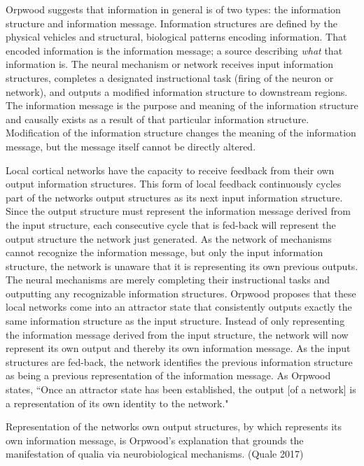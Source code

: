 \begin{myquote}
Orpwood suggests that information in general is of two types: the information structure and information message. Information structures are defined by the physical vehicles and structural, biological patterns encoding information. That encoded information is the information message; a source describing \textsl{what} that information is. The neural mechanism or network receives input information structures, completes a designated instructional task (firing of the neuron or network), and outputs a modified information structure to downstream regions. The information message is the purpose and meaning of the information structure and causally exists as a result of that particular information structure. Modification of the information structure changes the meaning of the information message, but the message itself cannot be directly altered.

Local cortical networks have the capacity to receive feedback from their own output information structures. This form of local feedback continuously cycles part of the networks output structures as its next input information structure. Since the output structure must represent the information message derived from the input structure, each consecutive cycle that is fed-back will represent the output structure the network just generated. As the network of mechanisms cannot recognize the information message, but only the input information structure, the network is unaware that it is representing its own previous outputs. The neural mechanisms are merely completing their instructional tasks and outputting any recognizable information structures. Orpwood proposes that these local networks come into an attractor state that consistently outputs exactly the same information structure as the input structure. Instead of only representing the information message derived from the input structure, the network will now represent its own output and thereby its own information message. As the input structures are fed-back, the network identifies the previous information structure as being a previous representation of the information message. As Orpwood states, “Once an attractor state has been established, the output [of a network] is a representation of its own identity to the network."

Representation of the networks own output structures, by which represents its own information message, is Orpwood's explanation that grounds the manifestation of qualia via neurobiological mechanisms. (Quale 2017)
\end{myquote}

